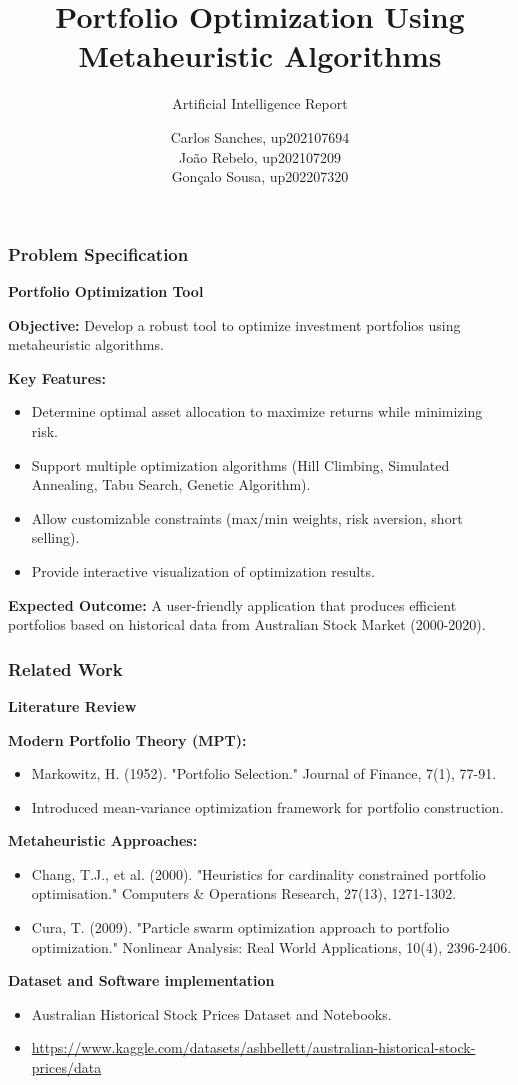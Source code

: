 \documentclass{beamer}
\title{Portfolio Optimization Using Metaheuristic Algorithms}
\subtitle{Artificial Intelligence Report}
\author{
    Carlos Sanches, up202107694 \\
    João Rebelo, up202107209 \\
    Gonçalo Sousa, up202207320
}
\begin{document}
\begin{frame}
    \titlepage
\end{frame}

\begin{frame}
    \frametitle{Problem Specification}
    \textbf{Portfolio Optimization Tool}

    \textbf{Objective:} Develop a robust tool to optimize investment portfolios using metaheuristic algorithms.

    \textbf{Key Features:}
    \begin{itemize}
        \item Determine optimal asset allocation to maximize returns while minimizing risk.
        \item Support multiple optimization algorithms (Hill Climbing, Simulated Annealing, Tabu Search, Genetic Algorithm).
        \item Allow customizable constraints (max/min weights, risk aversion, short selling).
        \item Provide interactive visualization of optimization results.
    \end{itemize}

    \textbf{Expected Outcome:} A user-friendly application that produces efficient portfolios based on historical data from Australian Stock Market (2000-2020).
\end{frame}

\begin{frame}
    \frametitle{Related Work}
    \textbf{Literature Review}

    \textbf{Modern Portfolio Theory (MPT):}
    \begin{itemize}
        \item Markowitz, H. (1952). "Portfolio Selection." Journal of Finance, 7(1), 77-91.
        \item Introduced mean-variance optimization framework for portfolio construction.
    \end{itemize}

    \textbf{Metaheuristic Approaches:}
    \begin{itemize}
        \item Chang, T.J., et al. (2000). "Heuristics for cardinality constrained portfolio optimisation." Computers \& Operations Research, 27(13), 1271-1302.
        \item Cura, T. (2009). "Particle swarm optimization approach to portfolio optimization." Nonlinear Analysis: Real World Applications, 10(4), 2396-2406.
    \end{itemize}

    \textbf{Dataset and Software implementation}
    \begin{itemize}
        \item Australian Historical Stock Prices Dataset and Notebooks.
        \item \url{https://www.kaggle.com/datasets/ashbellett/australian-historical-stock-prices/data}
    \end{itemize}
\end{frame}
\end{document}
